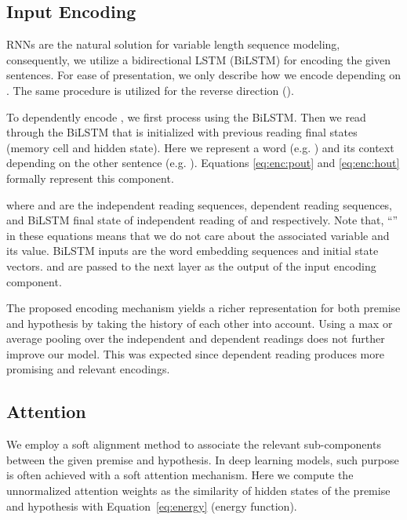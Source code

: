 \documentclass[11pt,a4paper]{article}
\begin{document}
	\subsection{Input Encoding}
	\label{sec:enc}
	
	RNNs are the natural solution for variable length sequence modeling, consequently, we utilize a bidirectional LSTM (BiLSTM) \cite{lstm} for encoding the given sentences. For ease of presentation, we only describe how we encode  depending on . The same procedure is utilized for the reverse direction (). 
	
	To dependently encode , we first process  using the BiLSTM. Then we read  through the BiLSTM that is initialized with previous reading final states (memory cell and hidden state). Here we represent a word (e.g. ) and its context depending on the other sentence (e.g. ).  Equations \ref{eq:enc:pout} and \ref{eq:enc:hout} formally represent this component.
	
	
	
	
	
	\noindent where  and  are the independent reading sequences, dependent reading sequences, and BiLSTM final state of independent reading of  and  respectively. Note that, ``'' in these equations means that we do not care about the associated variable and its value. BiLSTM inputs are the word embedding sequences and initial state vectors.  and  are passed to the next layer as the output of the input encoding component. 
	
	The proposed encoding mechanism yields a richer representation for both premise and hypothesis by taking the history of each other into account. Using a max or average pooling over the independent and dependent readings does not further improve our model. This was expected since dependent reading produces more promising and relevant encodings.
	
	\subsection{Attention}
	\label{sec:att}
	
	We employ a soft alignment method to associate the relevant sub-components between the given premise and hypothesis. In deep learning models, such purpose is often achieved with a soft attention mechanism. Here we compute the unnormalized attention weights as the similarity of hidden states of the premise and hypothesis with Equation~\ref{eq:energy} (energy function).
	
	
	
\end{document}
